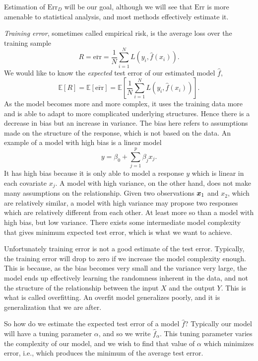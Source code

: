 Estimation of $\text{Err}_D$ will be our goal, although we will see that $\text{Err}$ is more amenable to statistical analysis, and most methods effectively estimate it.

\textit{Training error}, sometimes called empirical risk, is the average loss over the training sample
\begin{equation*}
    R=\overline{\text{err}}=\frac{1}{N}\sum_{i=1}^NL(y_i,\hat{f}(x_i)).
\end{equation*}
We would like to know the \textit{expected} test error of our estimated model $\hat{f}$,
\begin{equation*}
    \mathbb{E}[R]=\mathbb{E}[\overline{\text{err}}]=\mathbb{E}\left[\frac{1}{N}\sum_{i=1}^NL(y_i,\hat{f}(x_i))\right].
\end{equation*}
As the model becomes more and more complex, it uses the training data more and is able to adapt to more complicated underlying structures.
Hence there is a decrease in bias but an increase in variance.
The bias here refers to assumptions made on the structure of the response, which is not based on the data.
An example of a model with high bias is a linear model
\begin{equation*}
    y=\beta_0+\sum_{j=1}^p\beta_jx_j.
\end{equation*}
It has high bias because it is only able to model a response $y$ which is linear in each covariate $x_j$.
A model with high variance, on the other hand, does not make many assumptions on the relationship.
Given two observations $\bm{x}_1$ and $x_2$, which are relatively similar, a model with high variance may propose two responses which are relatively different from each other.
At least more so than a model with high bias, but low variance.
There exists some intermediate model complexity that gives minimum expected test error, which is what we want to achieve.

Unfortunately training error is not a good estimate of the test error.
Typically, the training error will drop to zero if we increase the model complexity enough.
This is because, as the bias becomes very small and the variance very large, the model ends up effectively learning the randomness inherent in the data, and not the structure of the relationship between the input $X$ and the output $Y$.
This is what is called overfitting.
An overfit model generalizes poorly, and it is generalization that we are after.

So how do we estimate the expected test error of a model $\hat{f}$?
Typically our model will have a tuning parameter $\alpha$, and so we write $\hat{f}_\alpha$.
This tuning parameter varies the complexity of our model, and we wish to find that value of $\alpha$ which minimizes error, i.e., which produces the minimum of the average test error.

